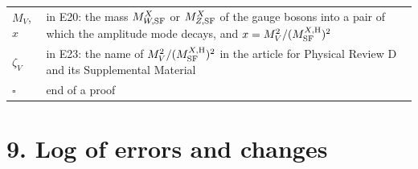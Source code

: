 \documentclass[
  10pt,
]{article}
\begin{document}
\begin{longtable}[]{@{}
  >{\raggedright\arraybackslash}p{}
  >{\raggedright\arraybackslash}p{}@{}}
\(M_V\), \(x\) & in E20: the mass \(M^X_{W,{\rm SF}}\) or
\(M^X_{Z,{\rm SF}}\) of the gauge bosons into a pair of which the
amplitude mode decays, and \(x=M_V^2/(M^{X,{\rm H}}_{\rm SF})^2\) \\
\(\zeta_V\) & in E23: the name of \(M_V^2/(M^{X,{\rm H}}_{\rm SF})^2\)
in the article for Physical Review D and its Supplemental Material \\
\(\square\) & end of a proof \\
\end{longtable}

\hypertarget{log-of-errors-and-changes}{%
\section{9. Log of errors and changes}\label{log-of-errors-and-changes}}
\end{document}
